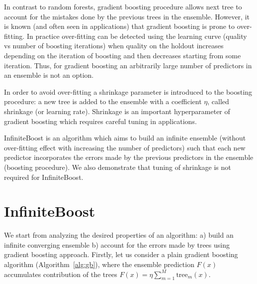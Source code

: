 In contrast to random forests, gradient boosting procedure allows next tree to account for the mistakes done by the previous trees in the ensemble.
However, it is known (and often seen in applications) that gradient boosting is prone to over-fitting.
In practice over-fitting can be detected using the learning curve (quality vs number of boosting iterations) when quality on the holdout increases depending on the iteration of boosting and then decreases starting from some iteration. 
Thus, for gradient boosting an arbitrarily large number of predictors in an ensemble is not an option. 


In order to avoid over-fitting a shrinkage parameter is introduced to the boosting procedure: a new tree is added to the ensemble with a coefficient $\eta$, called shrinkage (or learning rate).
Shrinkage is an important hyperparameter of gradient boosting which requires careful tuning in applications.

InfiniteBoost is an algorithm which aims to build an infinite ensemble (without over-fitting effect with increasing the number of predictors) such that each new predictor incorporates the errors made by the previous predictors in the ensemble (boosting procedure).
We also demonstrate that tuning of shrinkage is not required for InfiniteBoost. 

\section{InfiniteBoost}

We start from analyzing the desired properties of an algorithm:
a) build an infinite converging ensemble 
b) account for the errors made by trees using gradient boosting approach.
Firstly, let us consider a plain gradient boosting algorithm (Algorithm~\ref{alg:gb}),
where the ensemble prediction $F(x)$ accumulates contribution of the trees $ F(x) = \eta \sum_{m=1}^M \text{tree}_m(x) $.

